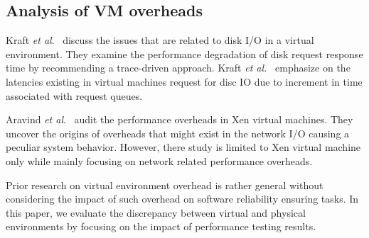 \subsection{Analysis of VM overheads}

Kraft \textit{et al$.$}~\cite{kraft2011io} discuss the issues that are related to disk I/O in a virtual environment. They examine the performance degradation of disk request response time by recommending a trace-driven approach. Kraft \textit{et al.}~\cite{kraft2011io} emphasize on the latencies existing in virtual machines request for disc IO due to increment in time associated with request queues. 

Aravind \textit{et al$.$}~\cite{menon2005diagnosing} audit the performance overheads in Xen virtual machines. They uncover the origins of overheads that might exist in the network I/O causing a peculiar system behavior. However, there study is limited to Xen virtual machine only while mainly focusing on network related performance overheads.

Prior research on virtual environment overhead is rather general without considering the impact of such overhead on software reliability ensuring tasks. In this paper, we evaluate the discrepancy between virtual and physical environments by focusing on the impact of performance testing results. 


